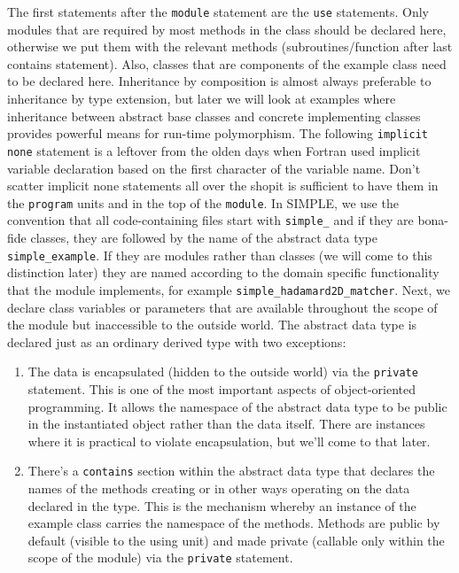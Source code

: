 \documentclass[a4paper,11pt]{article}
\begin{document}
The first statements after the \texttt{module} statement are the \texttt{use} statements. Only modules that are required by most methods in the class should be declared here, otherwise we put them with the relevant methods (subroutines/function after last contains statement). Also, classes that are components of the example class need to be declared here. Inheritance by composition is almost always preferable to inheritance by type extension, but later we will look at examples where inheritance between abstract base classes and concrete implementing classes provides powerful means for run-time polymorphism. The following \texttt{implicit none} statement is a leftover from the olden days when Fortran used implicit variable declaration based on the first character of the variable name. Don't scatter implicit none statements all over the shop\textemdash{}it is sufficient to have them in the \texttt{program} units and in the top of the \texttt{module}. In SIMPLE, we use the convention that all code-containing files start with \texttt{simple\_} and if they are bona-fide classes, they are followed by the name of the abstract data type \texttt{simple\_example}. If they are modules rather than classes (we will come to this distinction later)  they are named according to the domain specific functionality that the module implements, for example \texttt{simple\_hadamard2D\_matcher}. Next, we declare class variables or parameters that are available throughout the scope of the module but inaccessible to the outside world. The abstract data type is declared just as an ordinary derived type with two exceptions:
\begin{enumerate}
\item The data is encapsulated (hidden to the outside world) via the \texttt{private} statement. This is one of the most important aspects of object-oriented programming. It allows the namespace of the abstract data type to be public in the instantiated object rather than the data itself. There are instances where it is practical to violate encapsulation, but we'll come to that later.
\item There's a \texttt{contains} section within the abstract data type that declares the names of the methods creating or in other ways operating on the data declared in the type. This is the mechanism whereby an instance of the example class carries the namespace of the methods. Methods are public by default (visible to the using unit) and made private (callable only within the scope of the module) via the \texttt{private} statement.
\end{enumerate}
\end{document}
